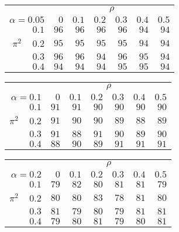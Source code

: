 \begin{tabular}{r|rrrrrr}
\hline\hline
 &\multicolumn{6}{c}{$\rho$} \\ 
 $\alpha = 0.05$ & $0$ & $0.1$ & $0.2$ & $0.3$ & $0.4$ & $0.5$ \\ 
 \hline$0.1$ & $96$ & $96$ & $96$ & $96$ & $94$ & $94$\\ 
$\pi^2\;\;\;$ $0.2$ & $95$ & $95$ & $95$ & $95$ & $94$ & $94$\\ 
$0.3$ & $96$ & $96$ & $94$ & $96$ & $95$ & $94$\\ 
$0.4$ & $94$ & $94$ & $94$ & $95$ & $95$ & $94$\\ 
 \hline 
 \end{tabular}
 
 \vspace{2em} 
 
\begin{tabular}{r|rrrrrr}
\hline\hline
 &\multicolumn{6}{c}{$\rho$} \\ 
 $\alpha = 0.1$ & $0$ & $0.1$ & $0.2$ & $0.3$ & $0.4$ & $0.5$ \\ 
 \hline$0.1$ & $91$ & $91$ & $90$ & $90$ & $90$ & $90$\\ 
$\pi^2\;\;\;$ $0.2$ & $91$ & $90$ & $90$ & $89$ & $88$ & $89$\\ 
$0.3$ & $91$ & $88$ & $91$ & $90$ & $89$ & $90$\\ 
$0.4$ & $88$ & $90$ & $89$ & $91$ & $91$ & $91$\\ 
 \hline 
 \end{tabular}
 
 \vspace{2em} 
 
\begin{tabular}{r|rrrrrr}
\hline\hline
 &\multicolumn{6}{c}{$\rho$} \\ 
 $\alpha = 0.2$ & $0$ & $0.1$ & $0.2$ & $0.3$ & $0.4$ & $0.5$ \\ 
 \hline$0.1$ & $79$ & $82$ & $80$ & $81$ & $81$ & $79$\\ 
$\pi^2\;\;\;$ $0.2$ & $80$ & $80$ & $83$ & $78$ & $81$ & $80$\\ 
$0.3$ & $81$ & $79$ & $80$ & $79$ & $81$ & $81$\\ 
$0.4$ & $79$ & $80$ & $81$ & $79$ & $80$ & $81$\\ 
 \hline 
 \end{tabular}
